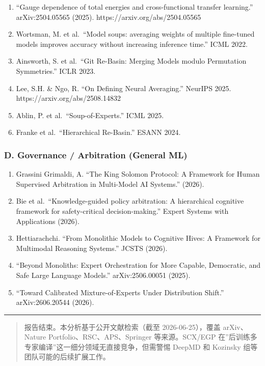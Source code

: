 \documentclass[
  12pt,
]{ctexart}
\providecommand{\tightlist}{%
  \setlength{\itemsep}{0pt}\setlength{\parskip}{0pt}}
\begin{document}
\begin{enumerate}
\def\labelenumi{\arabic{enumi}.}
\setcounter{enumi}{14}
\tightlist
\item
  ``Gauge dependence of total energies and cross-functional transfer
  learning.'' arXiv:2504.05565 (2025). https://arxiv.org/abs/2504.05565
\item
  Wortsman, M. et al.~``Model soups: averaging weights of multiple
  fine-tuned models improves accuracy without increasing inference
  time.'' ICML 2022.
\item
  Ainsworth, S. et al.~``Git Re-Basin: Merging Models modulo Permutation
  Symmetries.'' ICLR 2023.
\item
  Lee, S.H. \& Ngo, R. ``On Defining Neural Averaging.'' NeurIPS 2025.
  https://arxiv.org/abs/2508.14832
\item
  Ablin, P. et al.~``Soup-of-Experts.'' ICML 2025.
\item
  Franke et al.~``Hierarchical Re-Basin.'' ESANN 2024.
\end{enumerate}

\subsubsection{D. Governance / Arbitration (General
ML)}\label{d.-governance-arbitration-general-ml}

\begin{enumerate}
\def\labelenumi{\arabic{enumi}.}
\setcounter{enumi}{20}
\tightlist
\item
  Grassini Grimaldi, A. ``The King Solomon Protocol: A Framework for
  Human Supervised Arbitration in Multi-Model AI Systems.'' (2026).
\item
  Bie et al.~``Knowledge-guided policy arbitration: A hierarchical
  cognitive framework for safety-critical decision-making.'' Expert
  Systems with Applications (2026).
\item
  Hettiarachchi. ``From Monolithic Models to Cognitive Hives: A
  Framework for Multimodal Reasoning Systems.'' JCSTS (2026).
\item
  ``Beyond Monoliths: Expert Orchestration for More Capable, Democratic,
  and Safe Large Language Models.'' arXiv:2506.00051 (2025).
\item
  ``Toward Calibrated Mixture-of-Experts Under Distribution Shift.''
  arXiv:2606.20544 (2026).
\end{enumerate}

\begin{center}\rule{0.5\linewidth}{0.5pt}\end{center}

\begin{quote}
报告结束。本分析基于公开文献检索（截至 2026-06-25），覆盖 arXiv、Nature
Portfolio、RSC、APS、Springer 等来源。SCX/EGP
在''后训练多专家编译''这一细分领域无直接竞争，但需警惕 DeepMD 和
Kozinsky 组等团队可能的后续扩展工作。
\end{quote}
\end{document}
